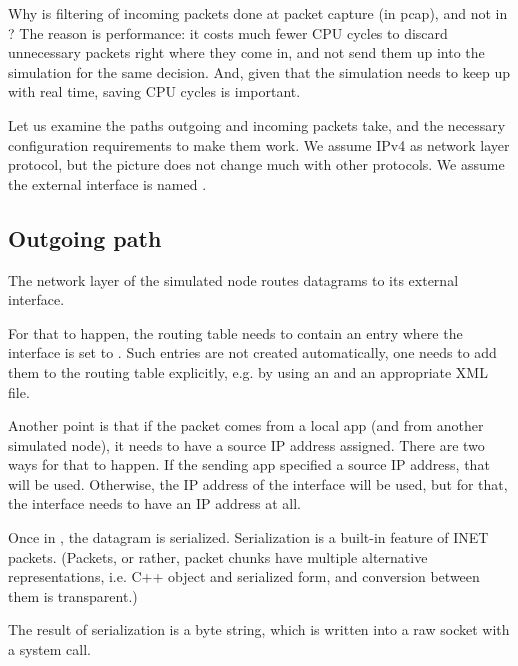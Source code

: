 \begin{note}
Why is filtering of incoming packets done at packet capture (in pcap),
and not in ? The reason is performance: it costs
much fewer CPU cycles to discard unnecessary packets right where
they come in, and not send them up into the simulation for the
same decision. And, given that the simulation needs to keep up with
real time, saving CPU cycles is important.
\end{note}

Let us examine the paths outgoing and incoming packets take, and the
necessary configuration requirements to make them work. We assume IPv4
as network layer protocol, but the picture does not change much with
other protocols. We assume the external interface is named .

\subsection*{Outgoing path}

The network layer of the simulated node routes datagrams to its
 external interface.

For that to happen, the routing table needs to contain an entry
where the interface is set to . Such entries are
not created automatically, one needs to add them to the routing
table explicitly, e.g. by using an 
and an appropriate XML file.

Another point is that if the packet comes from a local app (and from
another simulated node), it needs to have a source IP address assigned.
There are two ways for that to happen. If the sending app specified
a source IP address, that will be used. Otherwise, the IP address
of the  interface will be used, but for that, the interface
needs to have an IP address at all.

Once in , the datagram is serialized.
Serialization is a built-in feature of INET packets. (Packets, or rather,
packet chunks have multiple alternative representations, i.e. C++ object
and serialized form, and conversion between them is transparent.)

The result of serialization is a byte string, which is written into
a raw socket with a  system call.



